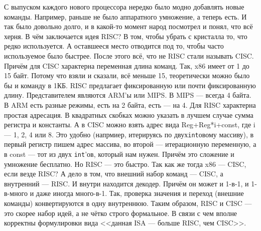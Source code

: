 \documentclass{article}
\begin{document}
    С выпуском каждого нового процессора нередко было модно добавлять новые команды. Например, раньше не было аппаратного умножение, а теперь есть. И так было довольно долго, и в какой-то момент народ посмотрел и понял, что всё херня. В чём заключается идея RISC? В том, чтобы убрать с кристалла то, что редко используется. А оставшееся место отводится под то, чтобы часто используемое было быстрее. После этого всё, что не RISC стали называть CISC. Причём для CISC характерна переменная длина команд. Так, x86 имеет от 1 до 15 байт. Потому что взяли и сказали, всё меньше 15, теоретически можно было бы и команду в 1КБ. RISC предлагает фиксированную или почти фиксированную длину. Представителем являются ARM'ы или MIPS. В MIPS --- всегда 4 байта. В ARM есть разные режимы, есть на 2 байта, есть --- на 4. Для RISC характерна простая адресация. В квадратных скобках можно указать в лучшем случае сумма регистра и константы. А в CISC можно взять адрес вида Reg+Reg*i+const, где i --- 1, 2, 4 или 8. Это удобно (напрмиер, итерируясь по двух\texttt{int}овому массиву), в первый регистр пишем адрес массива, во второй --- итерационную переменную, а в const --- тот из двух \texttt{int}'ов, который нам нужен. Причём это сложение и умножение бесплатно. Но RISC --- это быстро. Так как же тогда x86 --- CISC, если везде RISC? А дело в том, что внешний набор команд --- CISC, а внутренний --- RISC. И внутри находится декодер. Причём он может и 1-в-1, и 1-в-много и даже иногда много-в-1. Так, проверка значения и переход (внешние команды) конвертируются в одну внутреннюю. Таким образом, RISC и CISC --- это скорее набор идей, а не чётко строго формальное. В связи с чем вполне корректны формулировки вида <<данная ISA --- больше RISC, чем CISC>>.
\end{document}
